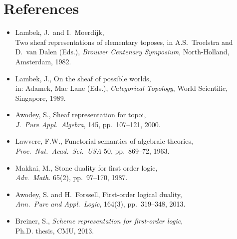 \documentclass[11pt]{article}
\begin{document}










\section{References}

\begin{itemize}
\item Lambek, J.\ and I.~Moerdijk,\\
 Two sheaf representations of elementary toposes, in 
 A.S.\ Troelstra and D.\ van Dalen (Eds.), \emph{Brouwer Centenary Symposium}, North-Holland, Amsterdam, 1982.
\item Lambek, J., On the sheaf of possible worlds,\\
 in: Adamek, Mac Lane (Eds.), \emph{Categorical Topology}, World Scientific, Singapore, 1989.
\item Awodey, S., Sheaf representation for topoi,\\
 \emph{J.\ Pure Appl.\ Algebra}, 145, pp.~107--121, 2000.
\item Lawvere, F.W., Functorial semantics of algebraic theories,  \emph{Proc.\ Nat.\ Acad.\ Sci.\ USA} 50, pp.~869--72, 1963.
\item Makkai, M., Stone duality for first order logic,\\
 \emph{Adv.\ Math.} 65(2), pp.~97--170,  1987.
\item Awodey, S. and H.~Forssell, First-order logical duality,\\
 \emph{Ann.\ Pure and Appl.\ Logic}, 164(3), pp.~319--348, 2013.
\item Breiner, S., \emph{Scheme representation for first-order logic},\\
 Ph.D. thesis, CMU, 2013.
\end{itemize}









\end{document}
